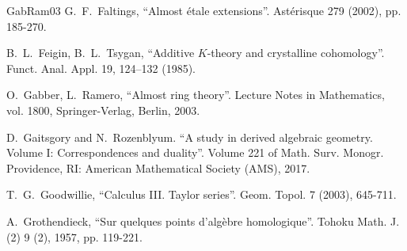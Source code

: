 \documentclass[11pt,leqno]{amsart}
\numberwithin{equation}{section}
\begin{document}
\begin{thebibliography}{GabRam03}
 G.~F.~Faltings, ``Almost étale extensions''. Ast\'erisque 279 (2002), pp. 185-270.

 B.~L.~Feigin, B.~L.~Tsygan, ``Additive $K$-theory and crystalline cohomology''. Funct. Anal. Appl. 19, 124–132 (1985).


 O.~Gabber, L.~Ramero, ``Almost ring theory''. Lecture Notes in Mathematics, vol. 1800, Springer-Verlag, Berlin, 2003.

 D.~Gaitsgory and N.~Rozenblyum. ``A study in derived algebraic geometry. Volume I: Correspondences and
duality''. Volume 221 of Math. Surv. Monogr. Providence, RI: American Mathematical Society (AMS), 2017.









 T.~G.~Goodwillie, ``Calculus III. Taylor series''. Geom. Topol. 7 (2003), 645-711.

 A.~Grothendieck, ``Sur quelques points d'alg\`ebre homologique''.
Tohoku Math. J. (2) 9 (2), 1957, pp. 119-221.



\end{thebibliography}
\end{document}
